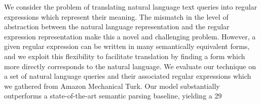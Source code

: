 We consider the problem of translating natural language text queries into regular expressions which represent their meaning.  The mismatch in the level
 of abstraction between the natural language representation and the regular
 expression representation make this a novel and challenging problem.  However,
 a given regular expression can be written in many semantically equivalent
 forms, and we exploit this flexibility to facilitate translation by finding a
 form which more directly corresponds to the natural language.  We evaluate our
 technique on a set of natural language queries and their associated regular
 expressions which we gathered from Amazon Mechanical Turk.  Our model
 substantially outperforms a state-of-the-art semantic parsing baseline,
 yielding a 29%


